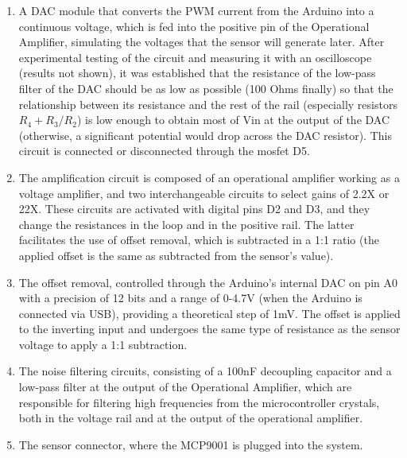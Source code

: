 \documentclass[conference]{IEEEtran}
\begin{document}
         \begin{enumerate}
            \item A DAC module that converts the PWM current from the Arduino into a continuous voltage, which is fed into the positive 
               pin of the Operational Amplifier, simulating the voltages that the sensor will generate later. After experimental testing of
               the circuit and measuring it with an oscilloscope (results not shown), it was established that the resistance of the low-pass
               filter of the DAC should be as low as possible (100 Ohms finally) so that the relationship between its resistance and the
               rest of the rail (especially resistors $R_4 + {R_3} / {R_2}$) is low enough to obtain most of Vin at the output of the
               DAC (otherwise, a significant potential would drop across the DAC resistor). This circuit is connected or disconnected
               through the mosfet D5.

            \item The amplification circuit is composed of an operational amplifier working as a voltage amplifier, and two interchangeable
               circuits to select gains of 2.2X or 22X. These circuits are activated with digital pins D2 and D3, and they change the resistances
               in the loop and in the positive rail. The latter facilitates the use of offset removal, which is subtracted in a 1:1 ratio
               (the applied offset is the same as subtracted from the sensor's value).

            \item The offset removal, controlled through the Arduino's internal DAC on pin A0 with a precision of 12 bits and a range of 0-4.7V
               (when the Arduino is connected via USB), providing a theoretical step of 1mV. The offset is applied to the inverting input and undergoes
               the same type of resistance as the sensor voltage to apply a 1:1 subtraction.

            \item The noise filtering circuits, consisting of a 100nF decoupling capacitor and a low-pass filter at the output of the Operational
               Amplifier, which are responsible for filtering high frequencies from the microcontroller crystals, both in the voltage rail and at
               the output of the operational amplifier.

            \item The sensor connector, where the MCP9001 is plugged into the system.
         \end{enumerate}
\end{document}
